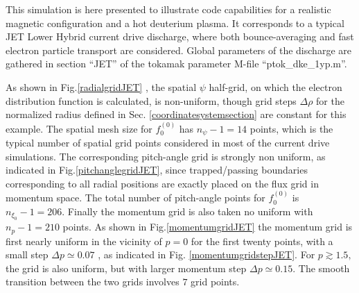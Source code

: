 

\label{fasttransportsection} This simulation is here presented to illustrate
code capabilities for a realistic magnetic configuration and a hot deuterium
plasma. It corresponds to a typical JET Lower Hybrid current drive
discharge, where both bounce-averaging and fast electron particle transport
are considered. Global parameters of the discharge are gathered in section
``JET'' of the tokamak parameter M-file ``ptok\_dke\_1yp.m''.

As shown in Fig.\ref{radialgridJET} , the spatial $\psi $ half-grid, on
which the electron distribution function is calculated, is non-uniform,
though grid steps $\Delta \rho $ for the normalized radius defined in Sec.
\ref{coordinatesystemsection} are constant for this example. The spatial
mesh size for $f_{0}^{\left( 0\right) }$ has $n_{\psi }-1=14$ points, which
is the typical number of spatial grid points considered in most of the
current drive simulations. The corresponding pitch-angle grid is strongly
non uniform, as indicated in Fig.\ref{pitchanglegridJET}, since
trapped/passing boundaries corresponding to all radial positions are exactly
placed on the flux grid in momentum space. The total number of pitch-angle
points for $f_{0}^{\left( 0\right) }$ is $n_{\xi _{0}}-1=206$. Finally the
momentum grid is also taken no uniform with $n_{p}-1=210$ points. As shown
in Fig.\ref{momentumgridJET} the momentum grid is first nearly uniform in
the vicinity of $p=0$ for the first twenty points, with a small step $\Delta %
p\simeq 0.07$ , as indicated in Fig. \ref{momentumgridstepJET}. For $%
p\gtrsim 1.5,$ the grid is also uniform, but with larger momentum step $%
\Delta p\simeq 0.15$. The smooth transition between the two grids involves $7
$ grid points.



